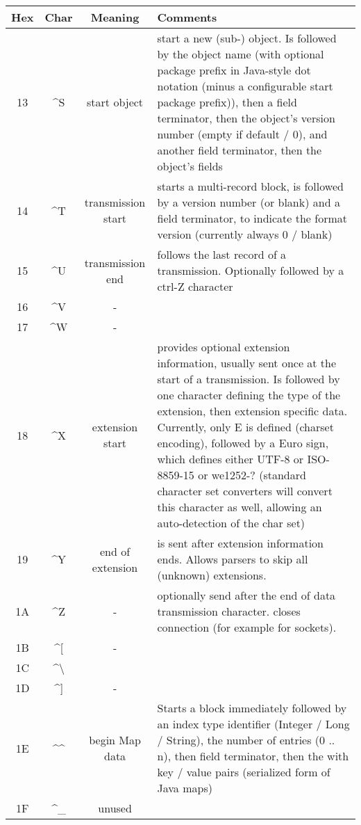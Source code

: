 \documentclass[11pt,a4paper,oneside]{article}
\begin{document}
\begin{tabular}{|c|c|c|p{8cm}|}
\hline
Hex & Char & Meaning & Comments \\
\hline
13 & \textasciicircum S & start object       & start a new (sub-) object. Is
followed by the object name (with optional package prefix in Java-style dot notation (minus a
configurable start package prefix)), then a field terminator, then the object's
version number (empty if default / 0), and another field terminator, then the
object's fields \\
14 & \textasciicircum T & transmission start & starts a multi-record block, is
followed by a version number (or blank) and a field terminator, to indicate
the format version (currently always 0 / blank) \\
15 & \textasciicircum U & transmission end   & follows the last record of a
transmission. Optionally followed by a ctrl-Z character \\
16 & \textasciicircum V &       -            & \\
17 & \textasciicircum W &       -            & \\
18 & \textasciicircum X & extension start   & provides optional extension information,
usually sent once at the start of a transmission. Is followed by one character
defining the type of the extension, then extension specific data. Currently,
only E is defined (charset encoding), followed by a Euro sign, which defines
either UTF-8 or ISO-8859-15 or we1252-? (standard character set converters will
convert this character as well, allowing an auto-detection of the char set)\\
19 & \textasciicircum Y & end of extension  & is sent after extension information ends.
Allows parsers to skip all (unknown) extensions. \\
1A & \textasciicircum Z & - & optionally send after the end of data
transmission character. closes connection (for example for sockets). \\
1B & \textasciicircum [ &       -            & \\
1C & \textasciicircum \textbackslash &                   & \\
1D & \textasciicircum ] & -& \\
1E & \textasciicircum \textasciicircum & begin Map data & Starts a block immediately followed by an index type identifier
(Integer / Long / String), the number of entries (0 .. n), then field terminator, then the with key / value pairs (serialized
form of Java maps)\\
1F & \textasciicircum \_ &  unused         & \\
\hline
\end{tabular}
\end{document}
